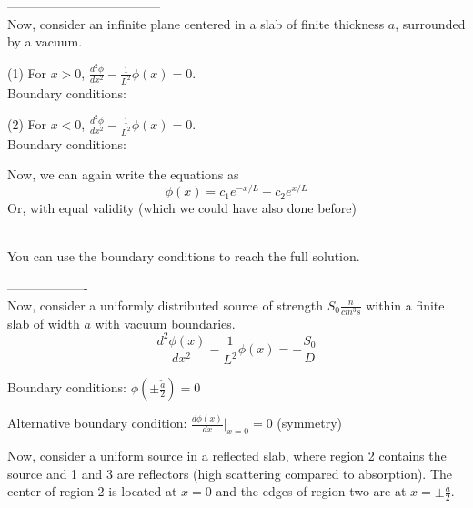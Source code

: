 \documentclass[12pt]{article}
\newif\ifeqns
\begin{document}
------------------------------------\\
Now, consider an infinite plane centered in a slab of finite thickness $a$, surrounded by a vacuum.


(1) For $x > 0$, $\frac{d^2\phi}{dx^2} - \frac{1}{L^2}\phi(x) = 0$.\\
%
Boundary conditions: 
\ifeqns
\begin{align*}
\lim\limits_{x\rightarrow 0^+}\vec{J}(x) &= \frac{S_0}{2}\:,\\
%
\phi(\tfrac{\tilde{a}}{2}) &= 0
\end{align*}
\else
\vspace*{6em}
\fi


(2) For $x < 0$, $\frac{d^2\phi}{dx^2} - \frac{1}{L^2}\phi(x) = 0$.\\
%
Boundary conditions: 
\ifeqns
\begin{align*}
{x\rightarrow 0^-}\vec{J}(x) &= -\frac{S_0}{2} \:,\\
%
 \phi(-\tfrac{\tilde{a}}{2}) &= 0
\end{align*}
\else
\vspace*{6em}
\fi

Now, we can again write the equations as
\[\phi(x) = c_1e^{-x/L} + c_2e^{x/L}\]
Or, with equal validity  (which we could have also done before)
\ifeqns
\[\phi(x) = c_1\cosh(\tfrac{x}{L}) + c_2\sinh(\tfrac{x}{L})\]
\else
\vspace*{3em}\\
\fi
%
You can use the boundary conditions to reach the full solution.



-------------------\\
Now, consider a uniformly distributed source of strength $S_0 \tfrac{n}{cm^3s}$ within a finite slab of
width $a$ with vacuum boundaries.
%
\begin{equation*}
\frac{d^2\phi(x)}{dx^2} - \frac{1}{L^2}\phi(x) = -\frac{S_0}{D}
\end{equation*}
\ifeqns
\begin{equation*}
\phi(x) = c_1e^{-x/L} + c_2e^{x/L} + \frac{S_0L^2}{D}
\end{equation*}
\else
\vspace*{3em}
\fi

Boundary conditions: $\phi(\pm\tfrac{\tilde{a}}{2}) = 0$


Alternative boundary condition: $\frac{d\phi(x)}{dx}\Bigr|_{x = 0} = 0$ (symmetry)


Now, consider a uniform source in a reflected slab, where region 2 contains the source and 1 and 3 are reflectors (high scattering compared to absorption). The center of region 2 is located at $x=0$ and the edges of region two are at $x=\pm \frac{a}{2}$.
\end{document}

